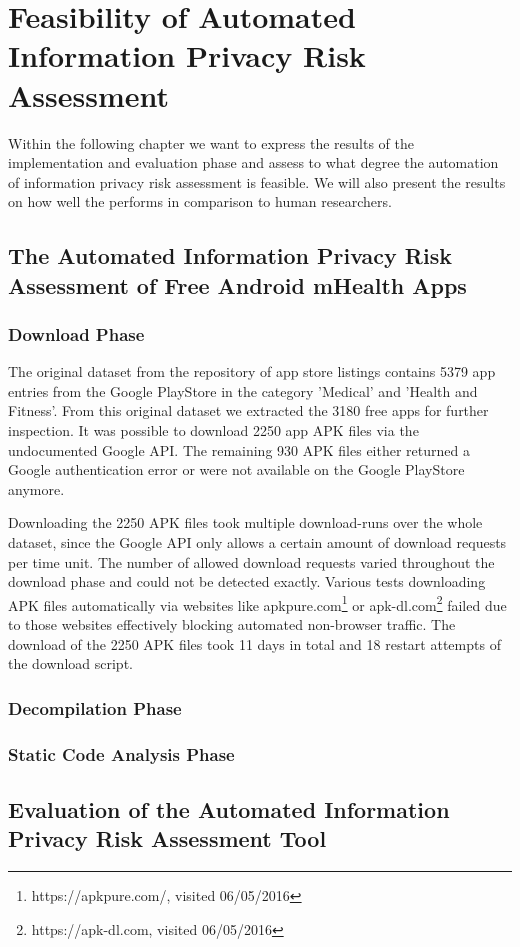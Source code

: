 \section{Feasibility of Automated Information Privacy Risk Assessment}

Within the following chapter we want to express the results of the implementation and evaluation phase and assess to what degree the automation of information privacy risk assessment is feasible.
We will also present the results on how well the \aiprat performs in comparison to human researchers.

\subsection{The Automated Information Privacy Risk Assessment of Free Android mHealth Apps}

\subsubsection{Download Phase}

The original dataset from the \cite{Xu2015} repository of app store listings contains 5379 app entries from the Google PlayStore in the category 'Medical' and 'Health and Fitness'.
From this original dataset we extracted the 3180 free apps for further inspection.
It was possible to download 2250 app APK files via the undocumented Google API.
The remaining 930 APK files either returned a Google authentication error or were not available on the Google PlayStore anymore.

Downloading the 2250 APK files took multiple download-runs over the whole dataset, since the Google API only allows a certain amount of download requests per time unit.
The number of allowed download requests varied throughout the download phase and could not be detected exactly.
Various tests downloading APK files automatically via websites like apkpure.com\footnote{https://apkpure.com/, visited 06/05/2016} or apk-dl.com\footnote{https://apk-dl.com, visited 06/05/2016} failed due to those websites effectively blocking automated non-browser traffic.
The download of the 2250 APK files took 11 days in total and 18 restart attempts of the download script.

\subsubsection{Decompilation Phase}

\subsubsection{Static Code Analysis Phase}


\subsection{Evaluation of the Automated Information Privacy Risk Assessment Tool}